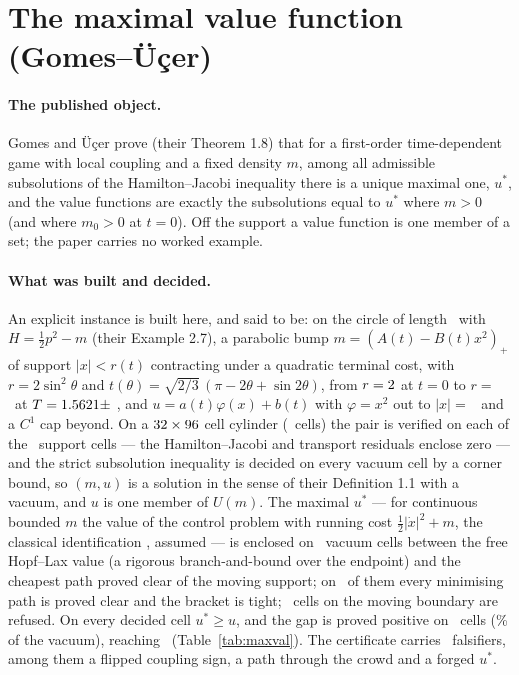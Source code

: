 \documentclass[11pt]{article}
\begin{document}
\section{The maximal value function (Gomes--\"U\c{c}er)}\label{sec:maxval}

\paragraph{The published object.} Gomes and \"U\c{c}er \cite{GU26} prove (their Theorem 1.8) that for a first-order time-dependent game with local coupling and a fixed density $m$, among all admissible subsolutions of the Hamilton--Jacobi inequality there is a unique maximal one, $u^*$, and the value functions are exactly the subsolutions equal to $u^*$ where $m > 0$ (and where $m_0 > 0$ at $t = 0$). Off the support a value function is one member of a set; the paper carries no worked example.

\paragraph{What was built and decided.} An explicit instance is built here, and said to be: on the circle of length \MVL\ with $H = \tfrac12 p^2 - m$ (their Example 2.7), a parabolic bump $m = (A(t) - B(t)x^2)_+$ of support $|x| < r(t)$ contracting under a quadratic terminal cost, with $r = 2\sin^2\theta$ and $t(\theta) = \sqrt{2/3}\,(\pi - 2\theta + \sin 2\theta)$, from $r = 2$ at $t = 0$ to $r = $ \MVrT\ at $T = 1.5621 \pm$ \MVTHalf, and $u = a(t)\varphi(x) + b(t)$ with $\varphi = x^2$ out to $|x| = $ \MVRhoZero\ and a $C^1$ cap beyond. On a $32 \times 96$ cell cylinder (\MVCells\ cells) the pair is verified on each of the \MVSupport\ support cells --- the Hamilton--Jacobi and transport residuals enclose zero --- and the strict subsolution inequality is decided on every vacuum cell by a corner bound, so $(m, u)$ is a solution in the sense of their Definition 1.1 with a vacuum, and $u$ is one member of $U(m)$. The maximal $u^*$ --- for continuous bounded $m$ the value of the control problem with running cost $\tfrac12|\dot x|^2 + m$, the classical identification \cite{BCD97}, assumed --- is enclosed on \MVDecided\ vacuum cells between the free Hopf--Lax value (a rigorous branch-and-bound over the endpoint) and the cheapest path proved clear of the moving support; on \MVTight\ of them every minimising path is proved clear and the bracket is tight; \MVRefused\ cells on the moving boundary are refused. On every decided cell $u^* \ge u$, and the gap is proved positive on \MVGapProven\ cells (\MVGapShare\% of the vacuum), reaching \MVMaxGap\ (Table~\ref{tab:maxval}). The certificate carries \MVFalsifiers\ falsifiers, among them a flipped coupling sign, a path through the crowd and a forged $u^*$.
\end{document}
